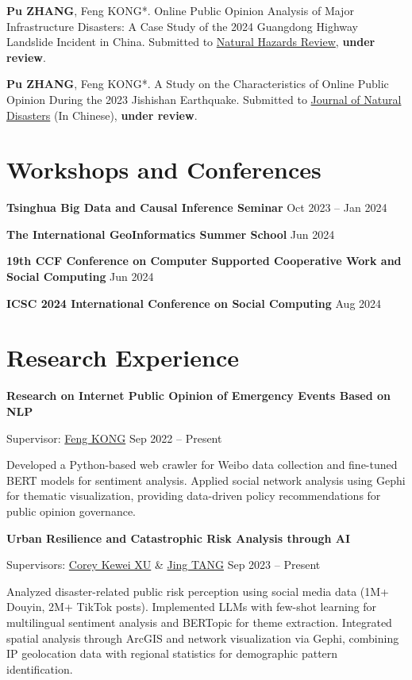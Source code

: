 \documentclass[letterpaper, 11pt]{article}
\newcommand{\sepspace}{\vspace{0.5em}}
\begin{document}
\sepspace
\textbf{Pu ZHANG}, Feng KONG*. Online Public Opinion Analysis of Major Infrastructure Disasters: A Case Study of the 2024 Guangdong Highway Landslide Incident in China. Submitted to \href{https://ascelibrary.org/journal/nhrefo}{Natural Hazards Review}, \textbf{under review}.

\sepspace
\textbf{Pu ZHANG}, Feng KONG*. A Study on the Characteristics of Online Public Opinion During the 2023 Jishishan Earthquake. Submitted to {\href{https://zrzh.paperonce.org/#/}{Journal of Natural Disasters}} (In Chinese), \textbf{under review}.

\section{Workshops and Conferences}
\textbf{Tsinghua Big Data and Causal Inference Seminar} \hfill Oct 2023 -- Jan 2024

\sepspace
\textbf{The International GeoInformatics Summer School} \hfill Jun 2024

\sepspace
\textbf{19th CCF Conference on Computer Supported Cooperative Work and Social Computing} \hfill Jun 2024

\sepspace
\textbf{ICSC 2024 International Conference on Social Computing} \hfill Aug 2024

\section{Research Experience}
\textbf{Research on Internet Public Opinion of Emergency Events Based on NLP}

Supervisor: \href{https://cohd.cau.edu.cn/art/2020/11/27/art_48059_998984.html}{Feng KONG} \hfill Sep 2022 -- Present

Developed a Python-based web crawler for Weibo data collection and fine-tuned BERT models for sentiment analysis. Applied social network analysis using Gephi for thematic visualization, providing data-driven policy recommendations for public opinion governance.

\sepspace
\textbf{Urban Resilience and Catastrophic Risk Analysis through AI}

Supervisors: \href{https://facultyprofiles.hkust-gz.edu.cn/faculty-personal-page/XU-Kewei/coreyxu}{Corey Kewei XU} \& \href{https://facultyprofiles.hkust-gz.edu.cn/faculty-personal-page/TANG-Jing/jingtang}{Jing TANG} \hfill Sep 2023 -- Present

Analyzed disaster-related public risk perception using social media data (1M+ Douyin, 2M+ TikTok posts). Implemented LLMs with few-shot learning for multilingual sentiment analysis and BERTopic for theme extraction. Integrated spatial analysis through ArcGIS and network visualization via Gephi, combining IP geolocation data with regional statistics for demographic pattern identification.
\end{document}
